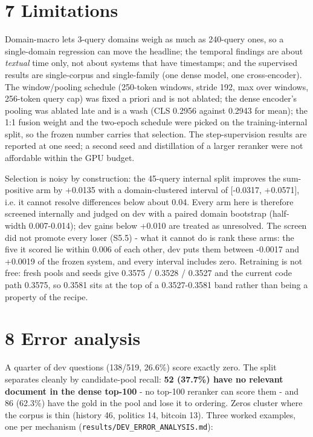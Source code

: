 \documentclass[11pt]{article}
\begin{document}
\section*{7 Limitations}
Domain-macro lets 3-query domains weigh as much as 240-query ones, so a single-domain regression can move the headline; the temporal findings are about \emph{textual} time only, not about systems that have timestamps; and the supervised results are single-corpus and single-family (one dense model, one cross-encoder). The window/pooling schedule (250-token windows, stride 192, max over windows, 256-token query cap) was fixed a priori and is not ablated; the dense encoder’s pooling was ablated late and is a wash (CLS 0.2956 against 0.2943 for mean); the 1:1 fusion weight and the two-epoch schedule were picked on the training-internal split, so the frozen number carries that selection. The step-supervision results are reported at one seed; a second seed and distillation of a larger reranker \citep{hinton2015distilling} were not affordable within the GPU budget.

Selection is noisy by construction: the 45-query internal split improves the sum-positive arm by +0.0135 with a domain-clustered interval of [-0.0317, +0.0571], i.e. it cannot resolve differences below about 0.04. Every arm here is therefore screened internally and judged on dev with a paired domain bootstrap (half-width 0.007-0.014); dev gains below +0.010 are treated as unresolved. The screen did not promote every loser (S5.5) - what it cannot do is rank these arms: the five it scored lie within 0.006 of each other, dev puts them between -0.0017 and +0.0019 of the frozen system, and every interval includes zero. Retraining is not free: fresh pools and seeds give 0.3575 / 0.3528 / 0.3527 and the current code path 0.3575, so 0.3581 sits at the top of a 0.3527-0.3581 band rather than being a property of the recipe.

\section*{8 Error analysis}
A quarter of dev questions (138/519, 26.6\%) score exactly zero. The split separates cleanly by candidate-pool recall: \textbf{52 (37.7\%) have no relevant document in the dense top-100} - no top-100 reranker can score them - and 86 (62.3\%) have the gold in the pool and lose it to ordering. Zeros cluster where the corpus is thin (history 46, politics 14, bitcoin 13). Three worked examples, one per mechanism (\texttt{results/DEV\_ERROR\_ANALYSIS.md}):
\end{document}
